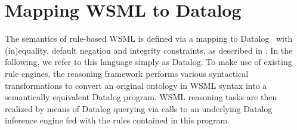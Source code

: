 \newcommand{\smtxtit}[1]{\ensuremath{\textit{\scriptsize{#1}}}}
\newcommand{\trans}[1]{\ensuremath{\tau_{#1}}\xspace}
\newcommand{\transtxt}[1]{\trans{\smtxtit{#1}}}
\def\transax{\transtxt{axioms}}
\def\transnorm{\transtxt{n}}
\def\translt{\transtxt{lt}}
\def\transdlog{\transtxt{dlog}}

\def\LE{\ensuremath{\mathcal{L\!E}}\xspace}
\def\O{\ensuremath{\mathcal{O}}\xspace}
\def\P{\ensuremath{\mathcal{P}}\xspace}
\newcommand{\powset}[1]{\ensuremath{2^{#1}}\xspace}
\def\lprl{\ensuremath{\;:\!-\:}}
\def\cstr{\ensuremath{\;!-\:}}
\def\qury{\ensuremath{\;?-\:}}
\def\dlogrule{\lprl}
\def\dlogcstr{\square\lprl}
\def\dlogand{\wedge}
\def\dlognot{\sim}
\newcommand{\dlogfact}[1]{\ensuremath{{#1}\;.}}

\newcommand{\predicate}[1]{\ensuremath{p_{#1}}\xspace}
\newcommand{\predsubtxt}[1]{\mathrm{\sf #1}}
\def\psco{\predicate{\predsubtxt{sco}}}
\def\pmo{\predicate{\predsubtxt{mo}}}
\def\phval{\predicate{\predsubtxt{hval}}}
\def\pitype{\predicate{\predsubtxt{itype}}}
\def\potype{\predicate{\predsubtxt{otype}}}
\def\mlaxioms{\ensuremath{P_{\smtxtit{meta}}}\xspace}

\newcommand{\typeof}{\ensuremath{\textit{typeOf}}\xspace}

\def\bla{\textbf{{\sf bla}}\xspace}

\section{Mapping WSML to Datalog\label{sec:mapping}}

The semantics of rule-based WSML is defined via a mapping to
Datalog~\cite{datalog,DBLP:books/aw/AbiteboulHV95} with
(in)equality, default negation and integrity constraints, as
described in \cite{wsml-spec}. In the following, we refer to this
language simply as Datalog. To make use of existing rule engines,
the reasoning framework performs various syntactical
transformations to convert an original ontology in WSML syntax
into a semantically equivalent Datalog program. WSML reasoning
tasks are then realized by means of Datalog querying via calls to
an underlying Datalog inference engine fed with the rules
contained in this program.





